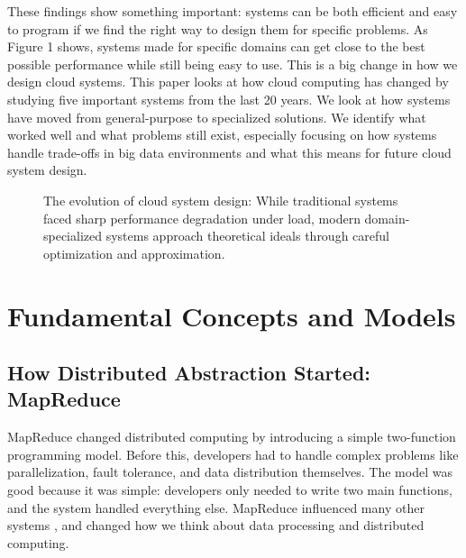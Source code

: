 \documentclass[12pt]{article}
\begin{document}
These findings show something important: systems can be both efficient and easy to program if we find the right way to design them for specific problems. As Figure 1 shows, systems made for specific domains can get close to the best possible performance while still being easy to use. This is a big change in how we design cloud systems. This paper looks at how cloud computing has changed by studying five important systems from the last 20 years. We look at how systems have moved from general-purpose to specialized solutions. We identify what worked well and what problems still exist, especially focusing on how systems handle trade-offs in big data environments and what this means for future cloud system design.

\begin{figure}[t]
\caption{The evolution of cloud system design: While traditional systems faced sharp performance degradation under load, modern domain-specialized systems approach theoretical ideals through careful optimization and approximation.}
\label{fig:tradeoff}
\end{figure}

\section{Fundamental Concepts and Models}

\subsection{How Distributed Abstraction Started: MapReduce}
MapReduce \cite{dean2008mapreduce} changed distributed computing by introducing a simple two-function programming model. Before this, developers had to handle complex problems like parallelization, fault tolerance, and data distribution themselves. The model was good because it was simple: developers only needed to write two main functions, and the system handled everything else. MapReduce influenced many other systems \cite{isard2007dryad}, and changed how we think about data processing and distributed computing.
\end{document}
